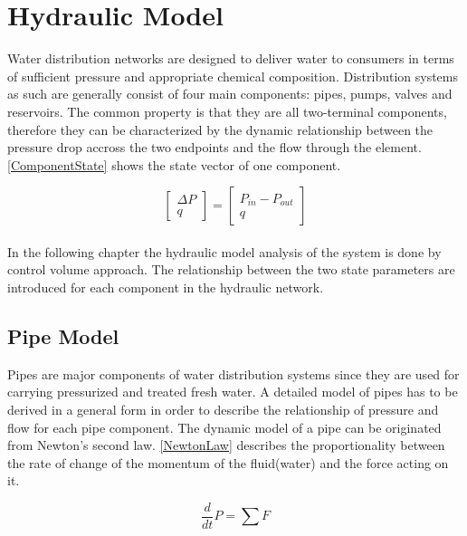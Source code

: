 \section{Hydraulic Model}
\label{HydraulicModel}

Water distribution networks are designed to deliver water to consumers in terms of sufficient pressure and appropriate chemical composition. Distribution systems as such are generally consist of four main components: pipes, pumps, valves and reservoirs. The common property is that they are all two-terminal components, therefore they can be characterized by the dynamic relationship between the pressure drop accross the two endpoints and the flow through the element.\cite{Kallesoe2009}  \eqref{ComponentState} shows the state vector of one component. 

\begin{equation}
\label{ComponentState}
 \begin{bmatrix}
    \Delta P \\
    q
\end{bmatrix}
=
 \begin{bmatrix}
    P_{in} - P_{out} \\
    q
\end{bmatrix}
\end{equation}
\\
In the following chapter the hydraulic model analysis of the system is done by control volume approach.\cite{Hunt_Fluidmechanics} 
The relationship between the two state parameters are introduced for each component in the hydraulic network.


\subsection{Pipe Model} 
\label{PipeModel}
Pipes are major components of water distribution systems since they are used for carrying pressurized and treated fresh water. A detailed model of pipes has to be derived in a general form in order to describe the relationship of pressure and flow for each pipe component.  
%
The dynamic model of a pipe can be originated from Newton's second law. \eqref{NewtonLaw} describes the proportionality between the rate of change of the momentum of the fluid(water) and the force acting on it.

\begin{equation}
  \frac{d}{dt} P = \sum F
  \label{NewtonLaw}
\end{equation} 

